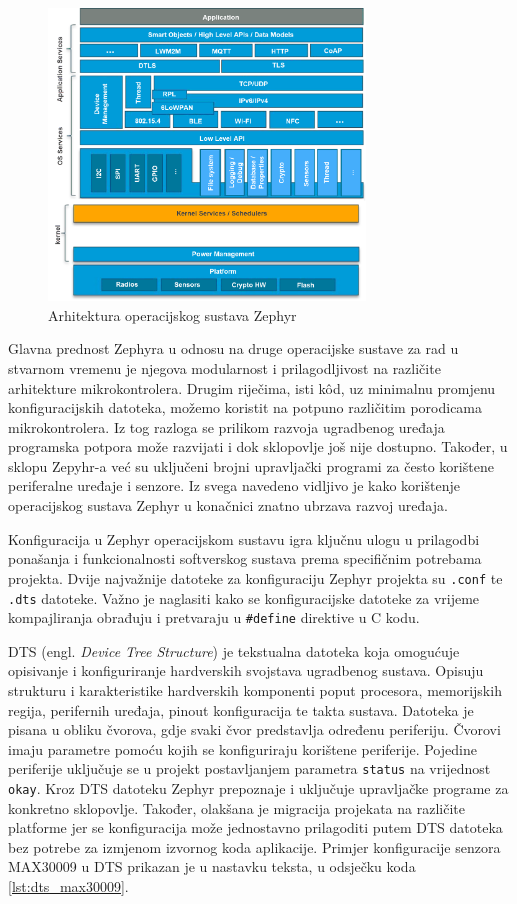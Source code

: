 \documentclass[../diplomski_rad.tex]{subfiles}
\begin{document}
\begin{figure}[htb]
    \centering
    \includegraphics[width=0.75\textwidth]{Figures/zephyr.png} 
    \caption{Arhitektura operacijskog sustava Zephyr \cite{zephyr}}
    \label{slk:zephyr}
\end{figure}

Glavna prednost Zephyra u odnosu na druge operacijske sustave za rad u stvarnom vremenu je njegova 
modularnost i prilagodljivost na različite arhitekture mikrokontrolera. 
Drugim riječima, isti k\^{o}d, uz minimalnu promjenu konfiguracijskih datoteka, možemo koristit na potpuno 
različitim porodicama mikrokontrolera. Iz tog razloga se prilikom razvoja ugradbenog uređaja programska 
potpora može razvijati i dok sklopovlje još nije dostupno.
Također, u sklopu Zepyhr-a već su uključeni brojni upravljački programi za često korištene periferalne 
uređaje i senzore. 
Iz svega navedeno vidljivo je kako korištenje operacijskog sustava Zephyr u konačnici 
znatno ubrzava razvoj uređaja.

Konfiguracija u Zephyr operacijskom sustavu igra ključnu ulogu u prilagodbi ponašanja i funkcionalnosti 
softverskog sustava prema specifičnim potrebama projekta.
Dvije najvažnije datoteke za konfiguraciju Zephyr projekta su \texttt{.conf} te \texttt{.dts} datoteke. 
Važno je naglasiti kako se konfiguracijske datoteke za vrijeme kompajliranja obrađuju i pretvaraju u 
\texttt{\#define} direktive u C kodu. 

DTS (engl. \textit{Device Tree Structure}) je tekstualna datoteka koja
omogućuje opisivanje i konfiguriranje hardverskih svojstava ugradbenog sustava.
Opisuju strukturu i karakteristike hardverskih komponenti poput procesora, 
memorijskih regija, perifernih uređaja, pinout konfiguracija te takta sustava.
Datoteka je pisana u obliku čvorova, gdje svaki čvor predstavlja određenu periferiju. 
Čvorovi imaju parametre pomoću kojih se konfiguriraju korištene periferije.  
Pojedine periferije uključuje se u projekt postavljanjem parametra \texttt{status} na vrijednost \texttt{okay}.
Kroz DTS datoteku Zephyr prepoznaje i uključuje upravljačke programe za konkretno sklopovlje. 
Također, olakšana je migracija projekata na različite platforme jer se konfiguracija može jednostavno 
prilagoditi putem DTS datoteka bez potrebe za izmjenom izvornog koda aplikacije.
Primjer konfiguracije senzora MAX30009 u DTS prikazan je u nastavku teksta, u odsječku koda \ref{lst:dts_max30009}. 
\end{document}
